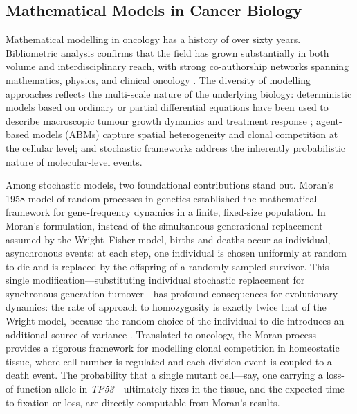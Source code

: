 \documentclass[12pt,a4paper]{article}
\begin{document}
\subsection{Mathematical Models in Cancer Biology}
\label{subsec:math_models}

Mathematical modelling in oncology has a history of over sixty years.
Bibliometric analysis confirms that the field has grown substantially in both volume
and interdisciplinary reach, with strong co-authorship networks spanning mathematics,
physics, and clinical oncology \cite{pugh2025}.
The diversity of modelling approaches reflects the multi-scale nature of the
underlying biology: deterministic models based on ordinary or partial differential
equations have been used to describe macroscopic tumour growth dynamics and
treatment response \cite{chauviere2010}; agent-based models (ABMs) capture
spatial heterogeneity and clonal competition at the cellular level; and
stochastic frameworks address the inherently probabilistic nature of molecular-level
events.

Among stochastic models, two foundational contributions stand out.
Moran's 1958 model of random processes in genetics \cite{moran1958} established
the mathematical framework for gene-frequency dynamics in a finite, fixed-size
population.
In Moran's formulation, instead of the simultaneous generational replacement assumed
by the Wright--Fisher model, births and deaths occur as individual, asynchronous
events: at each step, one individual is chosen uniformly at random to die and is
replaced by the offspring of a randomly sampled survivor.
This single modification---substituting individual stochastic replacement for
synchronous generation turnover---has profound consequences for evolutionary
dynamics: the rate of approach to homozygosity is exactly twice that of the
Wright model, because the random choice of the individual to die introduces
an additional source of variance \cite{moran1958}.
Translated to oncology, the Moran process provides a rigorous framework for
modelling clonal competition in homeostatic tissue, where cell number is
regulated and each division event is coupled to a death event.
The probability that a single mutant cell---say, one carrying a loss-of-function
allele in \textit{TP53}---ultimately fixes in the tissue, and the expected
time to fixation or loss, are directly computable from Moran's results.
\end{document}
